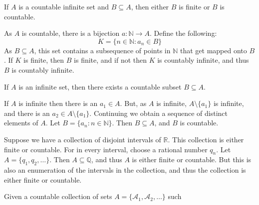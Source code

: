 \documentclass[crop=false,class=book,oneside]{standalone}
\begin{document}
            \begin{theorem}
                If $A$ is a countable infinite set and
                $B\subseteq{A}$, then either $B$ is finite or
                $B$ is countable.
            \end{theorem}
            \begin{bproof}
                As $A$ is countable, there is a bijection
                $a:\mathbb{N}\rightarrow{A}$. Define the following:
                \begin{equation}
                    K=\{n\in\mathbb{N}:a_{n}\in{B}\}
                \end{equation}
                As $B\subseteq{A}$,
                this set contains a subsequence of points in
                $\mathbb{N}$ that get mapped onto $B$. If $K$ is finite,
                then $B$ is finite, and if not then $K$ is countably
                infinite, and thus $B$ is countably infinite.
            \end{bproof}
            \begin{theorem}
                If $A$ is an infinite set, then there exists a
                countable subset $B\subseteq{A}$.
            \end{theorem}
            \begin{bproof}
                If $A$ is infinite then there is an
                $a_{1}\in{A}$. But, as $A$ is infinite,
                $A\setminus\{a_{1}\}$ is infinite, and there
                is an $a_{2}\in{A}\setminus\{a_{1}\}$. Continuing
                we obtain a sequence of distinct elements of $A$.
                Let $B=\{a_{n}:n\in\mathbb{N}\}$. Then
                $B\subseteq{A}$, and $B$ is countable.
            \end{bproof}
            \begin{lexample}
                Suppose we have a collection of disjoint intervals
                of $\mathbb{R}$. This collection is either finite
                or countable. For in every interval, choose a
                rational number $q_{n}$. Let
                $A=\{q_{1},q_{2},\hdots\}$. Then
                $A\subseteq\mathbb{Q}$, and thus $A$ is either
                finite or countable. But this is also an enumeration
                of the intervals in the collection, and thus the
                collection is either finite or countable.
            \end{lexample}
            Given a countable collection of sets
            $A=\{\mathcal{A}_{1},\mathcal{A}_{2},\hdots\}$ such
\end{document}
